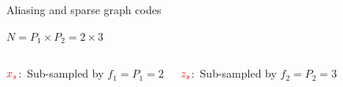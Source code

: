 \documentclass[10pt,xcolor=table]{beamer}
\begin{document}
	\begin{frame}{Aliasing and sparse graph codes}
	
	\begin{block}{$N = P_1 \times P_2 = 2 \times 3$}
		\begin{figure}[t]
			\begin{center}
				\resizebox{1.0\textwidth}{!}{}
			\end{center}
		\end{figure}
	\end{block}
	
	\begin{columns}
		
		\begin{block}{{\small $\color{red}x_s$:\ Sub-sampled by $f_1=P_1=2$}}
				\begin{figure}[t]
				\begin{center}
					\resizebox{1.0\textwidth}{!}{}
				\end{center}
			\end{figure}
		\end{block}
		
		\begin{block}{{\small$\color{red}z_s$:\ Sub-sampled by $f_2=P_2=3$}}
				\begin{figure}[t]
				\begin{center}
					\resizebox{1.0\textwidth}{!}{}
				\end{center}
			\end{figure}
		\end{block}
		

\end{columns}
\end{frame}
\end{document}
